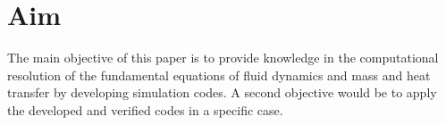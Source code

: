 \section{Aim}
The main objective of this paper is to provide knowledge in the computational resolution of the fundamental equations of fluid dynamics and mass and heat transfer by developing simulation codes. A second objective would be to apply the developed and verified codes in a specific case.
